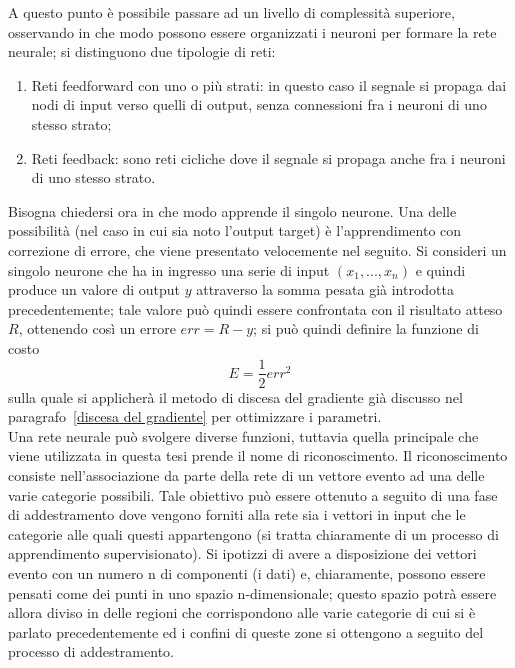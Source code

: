 A questo punto è possibile passare ad un livello di complessità superiore, osservando in che modo possono essere organizzati i neuroni per formare la rete neurale; si distinguono due tipologie di reti:
\begin{enumerate}
	\item Reti feedforward con uno o più strati: in questo caso il segnale si propaga dai nodi di input verso quelli di output, senza connessioni fra i neuroni di uno stesso strato;
	\item Reti feedback: sono reti cicliche dove il segnale si propaga anche fra i neuroni di uno stesso strato.
\end{enumerate}
Bisogna chiedersi ora in che modo apprende il singolo neurone. Una delle possibilità (nel caso in cui sia noto l'output target) è l'apprendimento con correzione di errore, che viene presentato velocemente nel seguito.
Si consideri un singolo neurone che ha in ingresso una serie di input $(x_1,...,x_n)$ e quindi produce un valore di output $y$ attraverso la somma pesata già introdotta precedentemente; tale valore può quindi essere confrontata con il risultato atteso $R$, ottenendo così un errore $err = R - y$; si può quindi definire la funzione di costo
\begin{equation}
E = \frac{1}{2}err^2
\end{equation}
sulla quale si applicherà il metodo di discesa del gradiente già discusso nel paragrafo~\ref{discesa del gradiente} per ottimizzare i parametri.\\
Una rete neurale può svolgere diverse funzioni, tuttavia quella principale che viene utilizzata in questa tesi prende il nome di riconoscimento. Il riconoscimento consiste nell'associazione da parte della rete di un vettore evento ad una delle varie categorie possibili. Tale obiettivo può essere ottenuto a seguito di una fase di addestramento dove vengono forniti alla rete sia i vettori in input che le categorie alle quali questi appartengono (si tratta chiaramente di un processo di apprendimento supervisionato). Si ipotizzi di avere a disposizione dei vettori evento con un numero n di componenti (i dati) e, chiaramente, possono essere pensati come dei punti in uno spazio n-dimensionale; questo spazio potrà essere allora diviso in delle regioni che corrispondono alle varie categorie di cui si è parlato precedentemente ed i confini di queste zone si ottengono a seguito del processo di addestramento. \\

